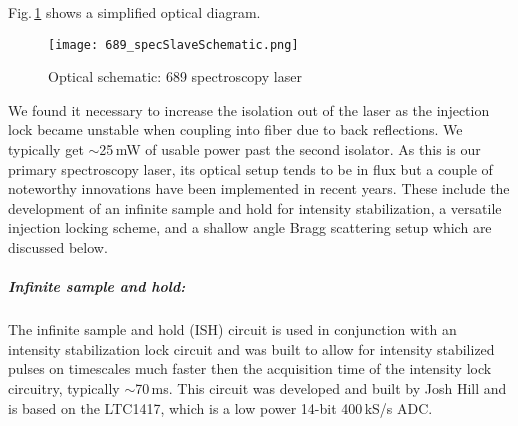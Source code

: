 Fig.\,\ref{fig:689specSch} shows a simplified optical diagram.
	\begin{figure}
	\centerline{
		\texttt{[image: 689\_specSlaveSchematic.png]}}
		\caption{Optical schematic: 689 spectroscopy laser}
		 \label{fig:689specSch}
	\end{figure}
We found it necessary to increase the isolation out of the laser as the injection lock became unstable when coupling into fiber due to back reflections.
We typically get $\sim$25\,mW of usable power past the second isolator.
As this is our primary spectroscopy laser, its optical setup tends to be in flux but a couple of noteworthy innovations have been implemented in recent years.
These include the development of an infinite sample and hold for intensity stabilization, a versatile injection locking scheme, and a shallow angle Bragg scattering setup which are discussed below.

\subparagraph{Infinite sample and hold:} \label{sec:infSH}
The infinite sample and hold (ISH) circuit is used in conjunction with an intensity stabilization lock circuit and was built to allow for intensity stabilized pulses on timescales much faster then the acquisition time of the intensity lock circuitry, typically $\sim$70\,ms.
This circuit was developed and built by Josh Hill and is based on the LTC1417, which is a low power 14-bit 400\,kS/s ADC.

